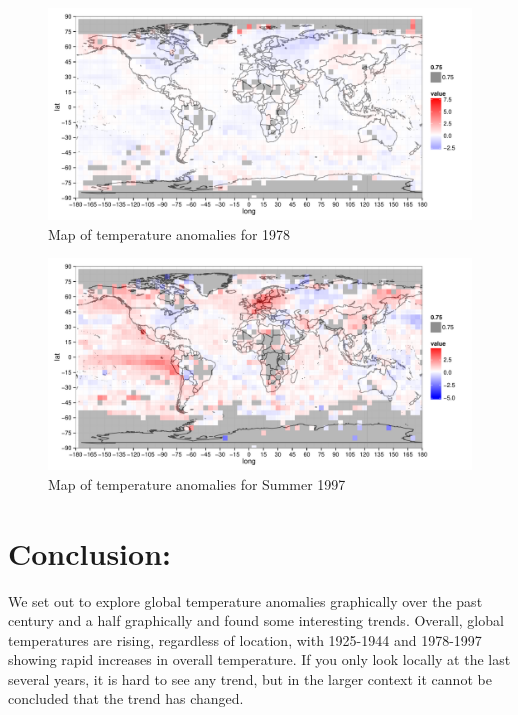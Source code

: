 \documentclass{article}\usepackage{graphicx, color}
\newenvironment{knitrout}{}{} %
\begin{document}
\begin{figure}[H]
\begin{knitrout}
\color{fgcolor}\includegraphics[width=\linewidth]{figure/1978-map} 
\end{knitrout}

\caption{\label{1978map}Map of temperature anomalies for 1978}
\end{figure}

\begin{figure}[H]
\begin{knitrout}
\color{fgcolor}\includegraphics[width=\linewidth]{figure/second1997map} 
\end{knitrout}

\caption{\label{another1997map}Map of temperature anomalies for Summer 1997}
\end{figure}

\section{Conclusion:}
We set out to explore global temperature anomalies graphically over the past century and a half graphically and found some interesting trends. Overall, global temperatures are rising, regardless of location, with 1925-1944 and 1978-1997 showing rapid increases in overall temperature. If you only look locally at the last several years, it is hard to see any trend, but in the larger context it cannot be concluded that the trend has changed.
\end{document}
